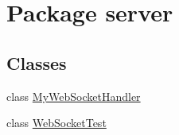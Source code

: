\hypertarget{namespaceserver}{}\section{Package server}
\label{namespaceserver}
\subsection*{Classes}
\begin{DoxyCompactItemize}
\item 
class \hyperlink{classserver_1_1_my_web_socket_handler}{My\+Web\+Socket\+Handler}
\item 
class \hyperlink{classserver_1_1_web_socket_test}{Web\+Socket\+Test}
\end{DoxyCompactItemize}
